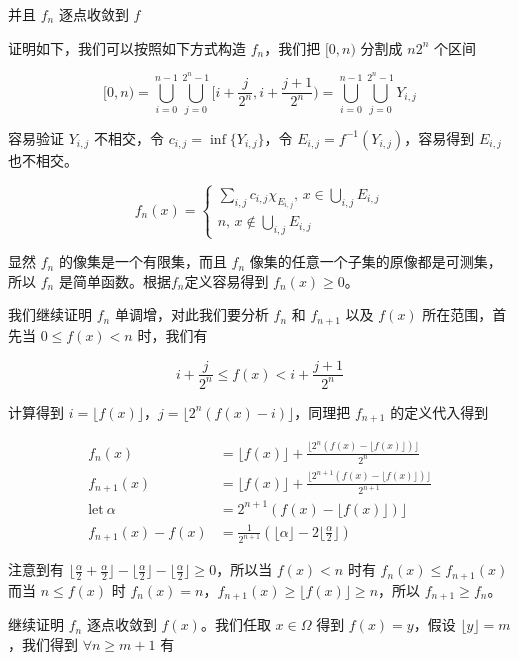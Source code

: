 并且 $f_n$ 逐点收敛到 $f$

证明如下，我们可以按照如下方式构造 $f_n$，我们把 $[0,n)$ 分割成 $n2^n$ 个区间 

\[
[0,n) = \bigcup_{i=0}^{n-1} \bigcup_{j=0}^{2^n-1} [i+\frac{j}{2^n}, i+\frac{j+1}{2^n}) = \bigcup_{i=0}^{n-1}\bigcup_{j=0}^{2^n-1}Y_{i,j}
\]

容易验证 $Y_{i,j}$ 不相交，令 $c_{i,j} = \inf \{ Y_{i,j}  \}$，令
$E_{i,j} = f^{-1}(Y_{i,j})$，容易得到 $E_{i,j}$  也不相交。

\[
f_n(x) = \begin{cases}
    \sum_{i,j}c_{i,j}\chi_{E_{i,j}} ,\, x \in \bigcup_{i,j}E_{i,j} \\
    n ,\, x \notin \bigcup_{i,j}E_{i,j}
\end{cases}
\]

显然 $f_n$ 的像集是一个有限集，而且 $f_n$ 像集的任意一个子集的原像都是可测集，所以 $f_n$ 是简单函数。根据$f_n$定义容易得到 $f_n(x) \ge 0$。

我们继续证明 $f_n$ 单调增，对此我们要分析 $f_n$ 和 $f_{n+1}$ 以及 $f(x)$ 所在范围，首先当 $0 \le f(x) < n$ 时，我们有

\[
i + \frac{j}{2^n} \le f(x) < i + \frac{j+1}{2^n}
\]

计算得到 $i = \lfloor f(x)\rfloor$，$j = \lfloor 2^n(f(x) - i) \rfloor $，同理把 $f_{n+1}$ 的定义代入得到

\begin{align*}
    f_n(x) & = \lfloor f(x)\rfloor + \frac{\lfloor 2^n(f(x) - \lfloor f(x) \rfloor) \rfloor}{2^n} \\
    f_{n+1}(x) &= \lfloor f(x)\rfloor + \frac{\lfloor 2^{n+1}(f(x) - \lfloor f(x)\rfloor) \rfloor}{2^{n+1}} \\
    \text{let}\: \alpha & = 2^{n+1}(f(x) - \lfloor f(x) \rfloor) \rfloor \\
    f_{n+1}(x) - f(x) &= \frac{1}{2^{n+1}}( \lfloor \alpha \rfloor -   2\lfloor \frac{\alpha}{2} \rfloor)
\end{align*}


注意到有 $\lfloor \frac{\alpha}{2} + \frac{\alpha}{2}  \rfloor -   \lfloor \frac{\alpha}{2} \rfloor - \lfloor \frac{\alpha}{2} \rfloor \ge 0$，所以当 $f(x) < n$ 时有 $f_n(x) \le f_{n+1}(x)$
而当 $n \le f(x) $ 时 $f_n(x) = n$，$f_{n+1}(x) \ge \lfloor f(x)\rfloor \ge n$，所以 $f_{n+1} \ge f_n$。

继续证明 $f_n$ 逐点收敛到 $f(x)$。我们任取 $x \in \Omega$ 得到 $f(x) = y$，假设 $\lfloor y \rfloor = m$，我们得到 $\forall n \ge m + 1$ 有


